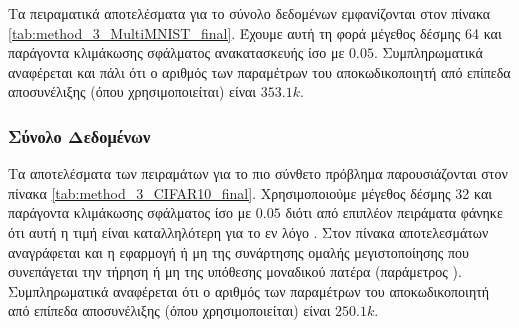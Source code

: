 Τα πειραματικά αποτελέσματα για το σύνολο δεδομένων  εμφανίζονται στον πίνακα \ref{tab:method_3_MultiMNIST_final}. Έχουμε αυτή τη φορά μέγεθος δέσμης 64 και παράγοντα κλιμάκωσης σφάλματος ανακατασκευής ίσο με $0.05$. Συμπληρωματικά αναφέρεται και πάλι ότι ο αριθμός των παραμέτρων του αποκωδικοποιητή από επίπεδα αποσυνέλιξης (όπου χρησιμοποιείται) είναι $353.1k$.

\begin{table}[h]
    \begin{center}
    \end{center}
    \caption[]{\label{tab:method_3_MultiMNIST_final}Επίδωση των αλγορίθμων της μεθόδου 3 στο σύνολο δεδομένων , όταν χρησιμοποιούνται 300 εποχές για την εκπαίδευση του μοντέλου με μέγεθος δέσμης 32.} 
\end{table}

\subsubsection{Σύνολο Δεδομένων }

Τα αποτελέσματα των πειραμάτων για το πιο σύνθετο πρόβλημα  παρουσιάζονται στον πίνακα \ref{tab:method_3_CIFAR10_final}. Χρησιμοποιούμε μέγεθος δέσμης 32 και παράγοντα κλιμάκωσης σφάλματος ίσο με $0.05$ διότι από επιπλέον πειράματα φάνηκε ότι αυτή η τιμή είναι καταλληλότερη για το εν λόγο . Στον πίνακα αποτελεσμάτων αναγράφεται και η εφαρμογή ή μη της συνάρτησης ομαλής μεγιστοποίησης που συνεπάγεται την τήρηση ή μη της υπόθεσης μοναδικού πατέρα (παράμετρος ). Συμπληρωματικά αναφέρεται ότι ο αριθμός των παραμέτρων του αποκωδικοποιητή από επίπεδα αποσυνέλιξης (όπου χρησιμοποιείται) είναι $250.1k$.

